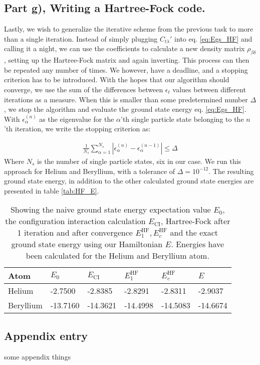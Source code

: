 \documentclass{article}
\newcommand{\hafo}[1]{#1^{\text{HF}}}
\begin{document}
\subsection*{Part g), Writing a Hartree-Fock code.}
    Lastly, we wish to generalize the iterative scheme from  the previous task to more than a single iteration. Instead of simply plugging $C_{t\lambda}'$ into eq. \eqref{eq:Egs_HF} and calling it a night, we can use the coefficients to calculate a new density matrix $\rho_{\beta\delta}$, setting up the Hartree-Fock matrix and again inverting. This process can then be repeated any number of times. We however, have a deadline, and a stopping criterion has to be introduced. With the hopes that our algorithm should converge, we use the sum of the differences between $\epsilon_t$ values between different iterations as a measure. When this is smaller than some predetermined number $\Delta$, we stop the algorithm and evaluate the ground state energy eq. \eqref{eq:Egs_HF}. With $\epsilon_\alpha^{(n)}$ as the eigenvalue for the $\alpha$'th single particle state belonging to the $n$'th iteration, we write the stopping criterion as:
    
    \begin{align*}
        \frac{1}{N_s}\sum_{\alpha=1}^{N_s} |\epsilon_\alpha^{(n)}-\epsilon_\alpha^{(n-1)}| \leq \Delta
    \end{align*}
    Where $N_s$ is the number of single particle states, six in our case. We run this approach for Helium and Beryllium, with a tolerance of $\Delta = 10^{-12}$. The resulting ground state energy, in addition to the other calculated ground state energies are presented in table \ref{tab:HF_E}.

    \begin{table}[H]
        \centering
        \begin{tabular}{l|l|l|l|l|l}
        Atom      & $E_0$ & $E_{\text{CI}}$ & $\hafo{E_1}$ & $\hafo{E_c}$ & $E$ \\
        \hline
        Helium    & -2.7500     & -2.8385    & -2.8291 & -2.8311  & -2.9037    \\
        Beryllium & -13.7160     & -14.3621    & -14.4998 & -14.5083  &   -14.6674 
        \end{tabular}
        \caption{Showing the naive ground state energy expectation value $E_0$, the configuration interaction calculation $E_{\text{CI}}$, Hartree-Fock after 1 iteration and after convergence $\hafo{E_1}, \hafo{E_c}$ and the exact ground state energy using our Hamiltonian $E$. Energies have been calculated for the Helium and Beryllium atom. } \label{tab:ALL_E}
    \end{table}

\begin{appendix}
    \section{Appendix entry}
    some appendix things
\end{appendix}
\cite{DFTgap}
\printbibliography
\end{document}
